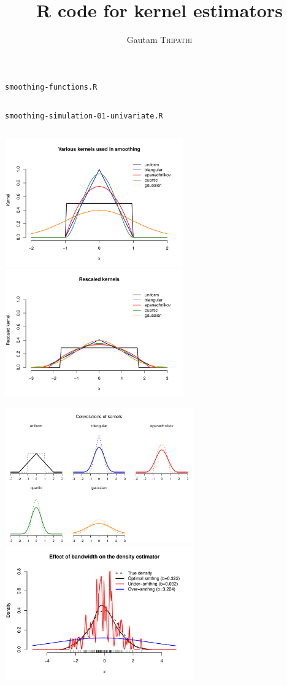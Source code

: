 \documentclass[11pt, a4paper]{article}
\author{Gautam \textsc{Tripathi}}
\title{R code for kernel estimators}
\begin{document}
	
\maketitle

\centerline{\texttt{smoothing-functions.R}}	
\inputminted[baselinestretch=0.9, fontsize=\footnotesize, breaklines, linenos]{R}{smoothing-functions.R}

\centerline{\texttt{smoothing-simulation-01-univariate.R}}
\inputminted[baselinestretch=0.9, fontsize=\footnotesize, breaklines, linenos]{R}{smoothing-simulation-01-univariate.R}

\begin{center}
\includegraphics[height=5.5cm]{output/10-kernels.pdf} \includegraphics[height=5.5cm]{output/11-kernels-rescaled.pdf}

\includegraphics[height=5.8cm]{output/12-convolutions.pdf}\includegraphics[height=5.8cm]{output/13-bandwidth-choice-consequences.pdf}


\end{center}
\end{document}
